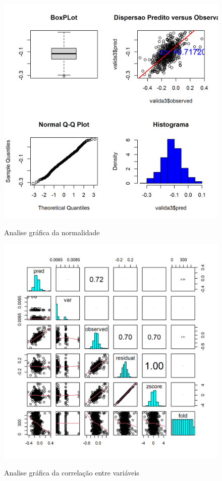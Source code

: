 			\begin{minipage}[t!]{0.332\textwidth}
					\begin{figure}[H]
				    \centering  \small \caption{Analise gráfica da  normalidade}
					\includegraphics[width=0.97\linewidth]{FIGURAS/valicas}
					\label{fig:valicas}
				\end{figure}
				
			\end{minipage}\hfill
			\begin{minipage}[t!]{0.32\textwidth}
					\begin{figure}[H]
					\centering  \small \caption{Analise gráfica da  correlação entre variáveis}
					\includegraphics[width=0.87\linewidth]{FIGURAS/painel-correla}
					\label{fig:painel-correla}
				\end{figure}
				
			\end{minipage} 
